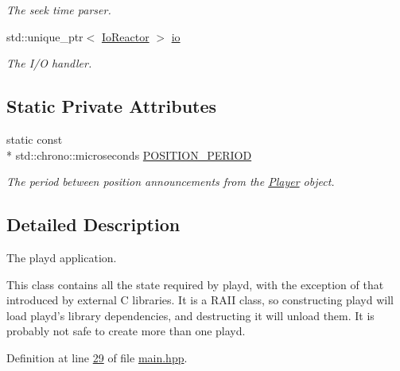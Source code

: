 \begin{DoxyCompactItemize}
\begin{DoxyCompactList}\small\item\em The seek time parser. \end{DoxyCompactList}\item 
\hypertarget{classplayd_a066cb450455e1359e4f80cfa5ecb5c05}{std\+::unique\+\_\+ptr$<$ \hyperlink{classIoReactor}{Io\+Reactor} $>$ \hyperlink{classplayd_a066cb450455e1359e4f80cfa5ecb5c05}{io}}\label{classplayd_a066cb450455e1359e4f80cfa5ecb5c05}

\begin{DoxyCompactList}\small\item\em The I/\+O handler. \end{DoxyCompactList}\end{DoxyCompactItemize}
\subsection*{Static Private Attributes}
\begin{DoxyCompactItemize}
\item 
\hypertarget{classplayd_a540bcb2dac9488bcb8e593378005bd07}{static const \\*
std\+::chrono\+::microseconds \hyperlink{classplayd_a540bcb2dac9488bcb8e593378005bd07}{P\+O\+S\+I\+T\+I\+O\+N\+\_\+\+P\+E\+R\+I\+O\+D}}\label{classplayd_a540bcb2dac9488bcb8e593378005bd07}

\begin{DoxyCompactList}\small\item\em The period between position announcements from the \hyperlink{classPlayer}{Player} object. \end{DoxyCompactList}\end{DoxyCompactItemize}


\subsection{Detailed Description}
The playd application. 

This class contains all the state required by playd, with the exception of that introduced by external C libraries. It is a R\+A\+I\+I class, so constructing playd will load playd's library dependencies, and destructing it will unload them. It is probably not safe to create more than one playd. 

Definition at line \hyperlink{main_8hpp_source_l00029}{29} of file \hyperlink{main_8hpp_source}{main.\+hpp}.



